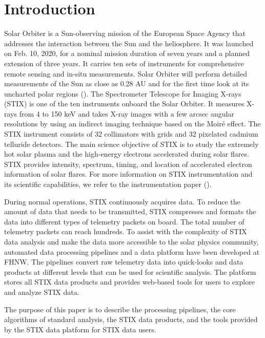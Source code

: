 \documentclass[referee]{aa} %
\begin{document}
\section{Introduction}
Solar Orbiter is a Sun-observing mission of the European Space Agency that 
addresses the interaction between the Sun and the heliosphere.
It was launched on Feb. 10, 2020, for a nominal mission duration of seven years and a planned 
extension of three years. It carries ten sets of instruments for comprehensive
remote sensing and in-situ measurements. 
Solar Orbiter will perform detailed measurements of the Sun as close as 0.28 AU and for the first time look at its uncharted polar regions (\cite{SolarOrbiter2020}).  
The Spectrometer Telescope for Imaging X-rays (STIX) is one of the ten instruments onboard the Solar Orbiter.  
It measures X-rays from 4 to 150 keV and takes X-ray images with a few arcsec angular resolutions by using an indirect imaging technique based on the Moiré effect.  The STIX instrument consists of 32 collimators with grids and 32 pixelated cadmium telluride detectors.  The main science objective of STIX is to study the extremely hot solar plasma and the high-energy electrons accelerated during solar flares. STIX provides intensity,  spectrum, timing, and location of accelerated electron information of solar flares. For more information on STIX instrumentation and its scientific capabilities, we refer to the instrumentation paper (\cite{stixinstrument}).


During normal operations, STIX continuously acquires data. To reduce the amount of data that needs to be transmitted, STIX compresses and formats the data into different types of telemetry packets on board. 
The total number of telemetry packets can reach hundreds. To assist with the complexity of STIX data analysis and make the data more accessible to the solar physics community, automated data processing pipelines and a data platform have been developed at FHNW. The pipelines convert raw telemetry data into quick-looks and data products at different levels that can be used for scientific analysis. The platform stores all STIX data products and provides web-based tools for users to explore and analyze STIX data.

 The purpose of this paper is to describe the processing pipelines,
 the core algorithms of standard analysis, the STIX data products, and the tools provided by the 
 STIX data platform for STIX data users.
\end{document}
